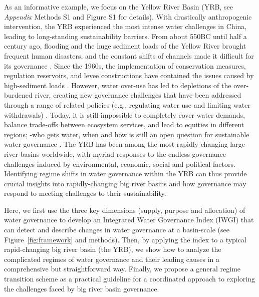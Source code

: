 As an informative example, we focus on the Yellow River Basin (YRB, see \textit{Appendix} Methods S1 and Figure S1 for details).
With drastically anthropogenic intervention, the YRB experienced the most intense water challenges in China, leading to long-standing sustainability barriers.
From about 550BC until half a century ago, flooding and the huge sediment loads of the Yellow River brought frequent human disasters, and the constant shifts of channels made it difficult for its governance
\cite{wangReducedsedimenttransport2016,liDecadalwaterstorage2020}.
Since the 1960s, the implementation of conservation measures, regulation reservoirs, and levee constructions have contained the issues caused by high-sediment loads
\cite{wangReducedsedimenttransport2016,wuEvolutioneffectssocialecological2020}.
However, water over-use has led to depletions of the over-burdened river, creating new governance challenges that have been addressed through a range of related policies (e.g., regulating water use and limiting water withdrawals)
\cite{xiaDevelopmentWaterAllocation2012}.
Today, it is still impossible to completely cover water demands, balance trade-offs between ecosystem services, and lead to equities in different regions; -who gets water, when and how is still an open question for sustainable water governance
\cite{wangYellowRiverwater2019,wohlfartSocialecologicalchallengesYellow2016}.
The YRB has been among the most rapidly-changing large river basins worldwide, with myriad responses to the endless governance challenges induced by environmental, economic, social and political factors. Identifying regime shifts in water governance within the YRB can thus provide crucial insights into rapidly-changing big river basins and how governance may respond to meeting challenges to their sustainability.

Here, we first use the three key dimensions (supply, purpose and allocation) of water governance to develop an Integrated Water Governance Index (IWGI) that can detect and describe changes in water governance at a basin-scale (see Figure~\ref{fig:framework} and methods).
Then, by applying the index to a typical rapid-changing big river basin (the YRB), we show how to analyze the complicated regimes of water governance and their leading causes in a comprehensive but straightforward way.
Finally, we propose a general regime transition scheme as a practical guideline for a coordinated approach to exploring the challenges faced by big river basin governance.

